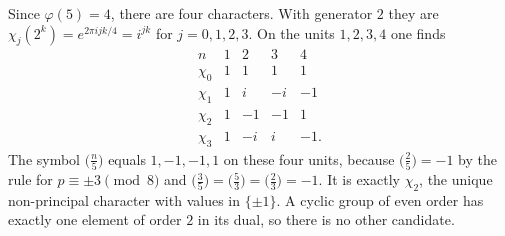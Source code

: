 \begin{examplex}
Since $\varphi(5)=4$, there are four characters. With generator $2$ they are $\chi_j(2^k)=e^{2\pi i jk/4}=i^{jk}$ for $j=0,1,2,3$. On the units $1,2,3,4$ one finds
\[
\begin{array}{c|cccc}
n&1&2&3&4\\\hline
\chi_0&1&1&1&1\\
\chi_1&1&i&-i&-1\\
\chi_2&1&-1&-1&1\\
\chi_3&1&-i&i&-1.
\end{array}
\]
The symbol $\bigl(\frac n5\bigr)$ equals $1, -1, -1, 1$ on these four units, because $\bigl(\frac25\bigr)=-1$ by the rule for $p\equiv\pm3\pmod8$ and $\bigl(\frac35\bigr)=\bigl(\frac53\bigr)=\bigl(\frac23\bigr)=-1$. It is exactly $\chi_2$, the unique non-principal character with values in $\{\pm1\}$. A cyclic group of even order has exactly one element of order $2$ in its dual, so there is no other candidate.
\end{examplex}

